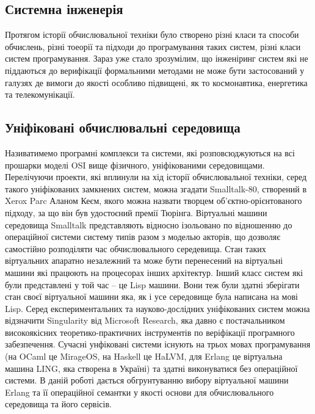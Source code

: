 \documentclass[11pt,oneside]{article}
\begin{document}
\vspace{1cm}


\subsection{Системна інженерія}

   Протягом історії обчислювальної техніки було створено різні класи та способи обчислень,
   різні тоеорії та підходи до програмування таких систем, різні класи систем програмування.
   Зараз уже стало зрозумілим, що інженіринг систем які не піддаються до верифікації
   формальними методами не може бути застосований у галузях де вимоги до якості
   особливо підвищені, як то космонавтика, енергетика та телекомунікації.

\subsection{Уніфіковані обчислювальні середовища}

   Називатимемо програмні комплекси та системи, які розповсюджуються на всі прошарки моделі OSI вище фізичного,
   уніфікованими середовищами. Перелічуючи проекти, які вплинули на хід історії
   обчислювальної техніки, серед такого уніфікованих замкнених систем, можна згадати Smalltalk-80,
   створений в Xerox Parc Аланом Кеєм, якого можна назвати творцем об'єктно-орієнтованого підходу, за що він був
   удостоєний премії Тюрінга. Віртуальні машини середовища Smalltalk представляють відносно ізольовано
   по відношенню до операційної системи систему типів разом з моделью акторів, що дозволяє
   самостійно розподіляти час обчислювального середевища. Стан таких віртуальних апаратно незалежний
   та може бути перенесений на віртуальні машини які працюють на процесорах інших архітектур.
   Інший класс систем які були представлені у той час -- це Lisp машини. Вони теж були
   здатні зберігати стан своєї віртуальної машини яка,
   як і усе середовище була написана на мові Lisp. Серед експериментальних та науково-дослідних
   уніфікованих систем можна відзначити Singularity від Microsoft Research, яка давно є постачальником
   високоякісних теоретико-практичних інструментів по веріфікації програмного забезпечення.
   Сучасні унфіковані системи існують на трьох мовах програмування (на OCaml це MirageOS,
   на Haskell це HaLVM, для Erlang це віртуальна машина LING, яка створена в Україні) та
   здатні виконуватися без операційної системи. В даній роботі дається обгрунтуванню вибору
   віртуальної машини Erlang та її операційної семантки у якості основи для обчислювального
   середовища та його сервісів.
\end{document}
